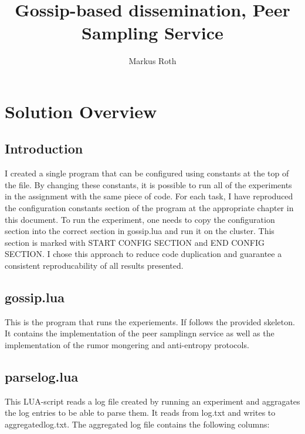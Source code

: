 \documentclass[a4paper]{article}
\title{Gossip-based dissemination, Peer Sampling Service}
\author{Markus Roth}
\begin{document}
\maketitle

\section{Solution Overview}

\subsection{Introduction}

I created a single program that can be configured using constants at the top of the file. By changing these constants, it is possible to run all of the experiments in the assignment with the same piece of code. For each task, I have reproduced the configuration constants section of the program at the appropriate chapter in this document. To run the experiment, one needs to copy the configuration section into the correct section in gossip.lua and run it on the cluster. This section is marked with START CONFIG SECTION and END CONFIG SECTION.
I chose this approach to reduce code duplication and guarantee a consistent reproducability of all results presented.

\subsection{gossip.lua}

This is the program that runs the experiements. If follows the provided skeleton. It contains the implementation of the peer samplingn service as well as the implementation of the rumor mongering and anti-entropy protocols.

\subsection{parselog.lua}

This LUA-script reads a log file created by running an experiment and aggragates the log entries to be able to parse them. It reads from log.txt and writes to aggregated\textunderscore log.txt. The aggregated log file contains the following columns:
\end{document}
